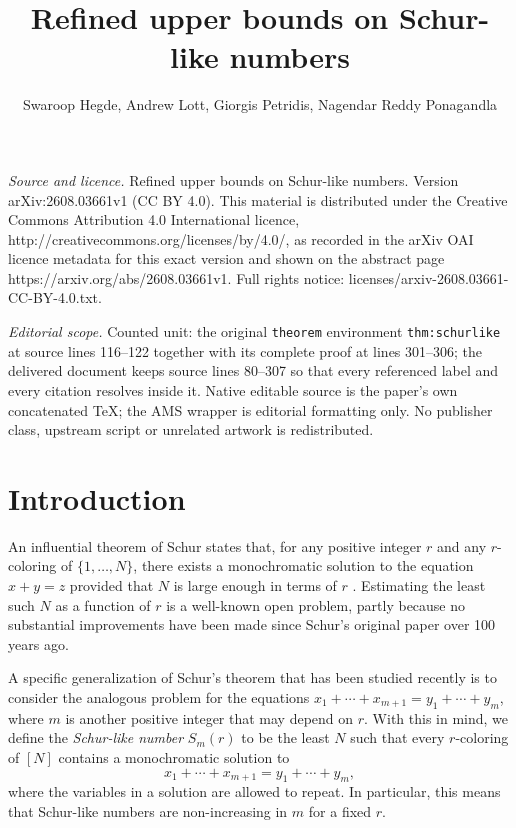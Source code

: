 \documentclass[10pt,a4paper]{amsart}
\begin{document}
\title[Refined upper bounds on Schur-like numbers]{Refined upper bounds on Schur-like numbers}
\author{Swaroop Hegde, Andrew Lott, Giorgis Petridis, Nagendar Reddy Ponagandla}
\date{}
\maketitle
\noindent\emph{Source and licence.} Refined upper bounds on Schur-like numbers. Version arXiv:2608.03661v1 (CC BY 4.0). This material is distributed under the Creative Commons Attribution 4.0 International licence, http://creativecommons.org/licenses/by/4.0/, as recorded in the arXiv OAI licence metadata for this exact version and shown on the abstract page https://arxiv.org/abs/2608.03661v1. Full rights notice: licenses/arxiv-2608.03661-CC-BY-4.0.txt.\par\smallskip
\noindent\textit{Editorial scope.} Counted unit: the original \texttt{theorem} environment \texttt{thm:schurlike} at source lines 116--122 together with its complete proof at lines 301--306; the delivered document keeps source lines 80--307 so that every referenced label and every citation resolves inside it. Native editable source is the paper's own concatenated TeX; the AMS wrapper is editorial formatting only. No publisher class, upstream script or unrelated artwork is redistributed.
\section{Introduction}

An influential theorem of Schur states that, for any positive integer $r$ and any $r$-coloring of $\{1, \dots, N\}$, there exists a monochromatic solution to the equation $x+y=z$ provided that $N$ is large enough in terms of $r$ \cite{Schur1917}. Estimating the least such $N$ as a function of $r$ is a well-known open problem, partly because no substantial improvements have been made since Schur's original paper over 100 years ago.

A specific generalization of Schur's theorem that has been studied recently is to consider the analogous problem for the equations $x_1+\cdots+x_{m+1}=y_1+\cdots+y_m$, where $m$ is another positive integer that may depend on $r$. With this in mind, we define the \emph{Schur-like number} \(S_m(r)\) to be the least \(N\) such that every \(r\)-coloring of \([N]\) contains a monochromatic solution to 
\begin{equation}\label{eq:schurlike}
    x_1+\cdots+x_{m+1}=y_1+\cdots+y_m,
\end{equation}
where the variables in a solution are allowed to repeat. In particular, this means that Schur-like numbers are non-increasing in $m$ for a fixed $r$. 
\end{document}
